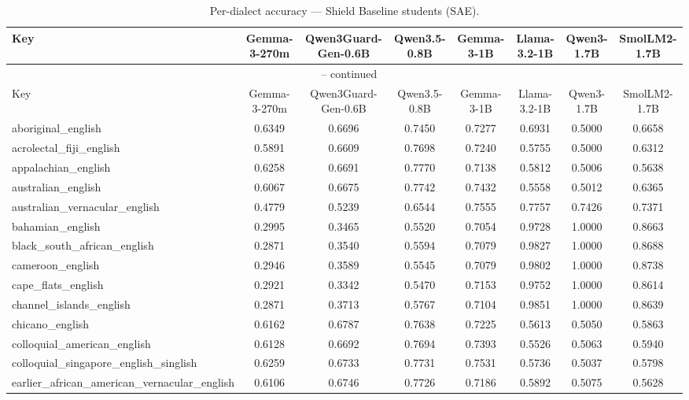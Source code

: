\begin{landscape}
\begin{longtable}{lccccccc}
\caption{Per-dialect accuracy — Shield Baseline students (SAE).} \\
\label{tab:students_baseline_per_dialect_sae}
\toprule
Key & Gemma-3-270m & Qwen3Guard-Gen-0.6B & Qwen3.5-0.8B & Gemma-3-1B & Llama-3.2-1B & Qwen3-1.7B & SmolLM2-1.7B \\
\midrule
\endfirsthead
\multicolumn{8}{c}{\tablename\ \thetable{} -- continued} \\
\toprule
Key & Gemma-3-270m & Qwen3Guard-Gen-0.6B & Qwen3.5-0.8B & Gemma-3-1B & Llama-3.2-1B & Qwen3-1.7B & SmolLM2-1.7B \\
\midrule
\endhead
aboriginal\_english & 0.6349 & 0.6696 & 0.7450 & 0.7277 & 0.6931 & 0.5000 & 0.6658 \\
acrolectal\_fiji\_english & 0.5891 & 0.6609 & 0.7698 & 0.7240 & 0.5755 & 0.5000 & 0.6312 \\
appalachian\_english & 0.6258 & 0.6691 & 0.7770 & 0.7138 & 0.5812 & 0.5006 & 0.5638 \\
australian\_english & 0.6067 & 0.6675 & 0.7742 & 0.7432 & 0.5558 & 0.5012 & 0.6365 \\
australian\_vernacular\_english & 0.4779 & 0.5239 & 0.6544 & 0.7555 & 0.7757 & 0.7426 & 0.7371 \\
bahamian\_english & 0.2995 & 0.3465 & 0.5520 & 0.7054 & 0.9728 & 1.0000 & 0.8663 \\
black\_south\_african\_english & 0.2871 & 0.3540 & 0.5594 & 0.7079 & 0.9827 & 1.0000 & 0.8688 \\
cameroon\_english & 0.2946 & 0.3589 & 0.5545 & 0.7079 & 0.9802 & 1.0000 & 0.8738 \\
cape\_flats\_english & 0.2921 & 0.3342 & 0.5470 & 0.7153 & 0.9752 & 1.0000 & 0.8614 \\
channel\_islands\_english & 0.2871 & 0.3713 & 0.5767 & 0.7104 & 0.9851 & 1.0000 & 0.8639 \\
chicano\_english & 0.6162 & 0.6787 & 0.7638 & 0.7225 & 0.5613 & 0.5050 & 0.5863 \\
colloquial\_american\_english & 0.6128 & 0.6692 & 0.7694 & 0.7393 & 0.5526 & 0.5063 & 0.5940 \\
colloquial\_singapore\_english\_singlish & 0.6259 & 0.6733 & 0.7731 & 0.7531 & 0.5736 & 0.5037 & 0.5798 \\
earlier\_african\_american\_vernacular\_english & 0.6106 & 0.6746 & 0.7726 & 0.7186 & 0.5892 & 0.5075 & 0.5628 \\

\end{longtable}
\end{landscape}
